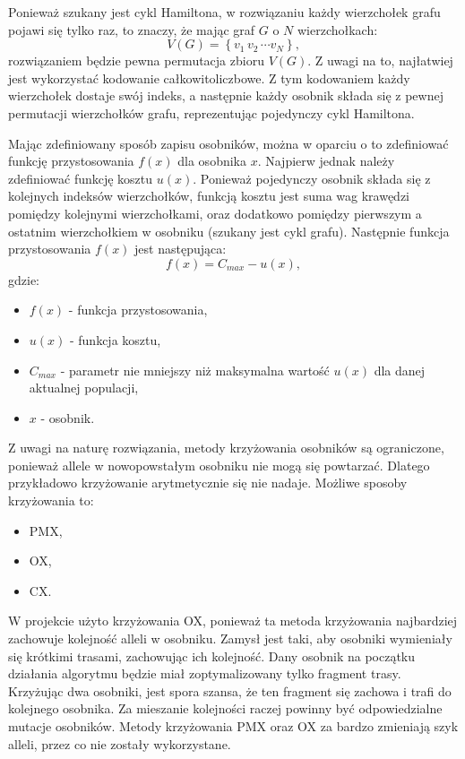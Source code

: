 \documentclass[11pt]{article}
\begin{document}
Ponieważ szukany jest cykl Hamiltona, w rozwiązaniu
każdy wierzchołek grafu pojawi się tylko raz, to znaczy, że mając graf $G$ o $N$
wierzchołkach:
\begin{equation}
    V\left(G\right) = \left\{ v_1 \, v_2 \, \cdots v_N \right\},
\end{equation}
rozwiązaniem będzie pewna permutacja zbioru $V\left(G\right)$. Z uwagi na to,
najłatwiej jest wykorzystać kodowanie całkowitoliczbowe. Z tym kodowaniem każdy
wierzchołek dostaje swój indeks, a następnie każdy osobnik składa się z pewnej
permutacji wierzchołków grafu, reprezentując pojedynczy cykl Hamiltona.

Mając zdefiniowany sposób zapisu osobników, można w oparciu o to zdefiniować
funkcję przystosowania $f \left( x \right)$ dla osobnika $x$. Najpierw jednak
należy zdefiniować funkcję kosztu $u \left( x \right)$. Ponieważ pojedynczy
osobnik składa się z kolejnych indeksów wierzchołków, funkcją kosztu jest
suma wag krawędzi pomiędzy kolejnymi wierzchołkami, oraz dodatkowo pomiędzy
pierwszym a ostatnim wierzchołkiem w osobniku (szukany jest cykl grafu).
Następnie funkcja przystosowania $f \left( x \right)$ jest następująca:
\begin{equation}
    f \left( x \right) = C_{max} - u \left( x \right),
\end{equation}
gdzie:
\begin{itemize}
    \item[] $f \left( x \right)$ - funkcja przystosowania,
    \item[] $u \left( x \right)$ - funkcja kosztu,
    \item[] $C_{max}$ - parametr nie mniejszy niż maksymalna wartość
            $u \left( x \right)$ dla danej aktualnej populacji,
    \item[] $x$ - osobnik.
\end{itemize}

Z uwagi na naturę rozwiązania, metody krzyżowania osobników są ograniczone,
ponieważ allele w nowopowstałym osobniku nie mogą się powtarzać. Dlatego
przykładowo krzyżowanie arytmetycznie się nie nadaje. Możliwe sposoby
krzyżowania to:
\begin{itemize}
    \item PMX,
    \item OX,
    \item CX.
\end{itemize}
W projekcie użyto krzyżowania OX, ponieważ ta metoda krzyżowania najbardziej
zachowuje kolejność alleli w osobniku. Zamysł jest taki, aby osobniki wymieniały
się krótkimi trasami, zachowując ich kolejność. Dany osobnik na początku
działania algorytmu będzie miał zoptymalizowany tylko fragment trasy. Krzyżując
dwa osobniki, jest spora szansa, że ten fragment się zachowa i trafi do
kolejnego osobnika. Za mieszanie kolejności raczej powinny być odpowiedzialne
mutacje osobników. Metody krzyżowania PMX oraz OX za bardzo zmieniają szyk
alleli, przez co nie zostały wykorzystane.
\end{document}
